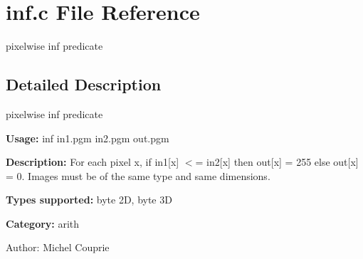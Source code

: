 \section{inf.c File Reference}
\label{inf_8c}
pixelwise inf predicate  




\label{_details}
\subsection{Detailed Description}
pixelwise inf predicate 

{\bf Usage:} inf in1.pgm in2.pgm out.pgm

{\bf Description:} For each pixel x, if in1[x] $<$= in2[x] then out[x] = 255 else out[x] = 0. Images must be of the same type and same dimensions.

{\bf Types supported:} byte 2D, byte 3D

{\bf Category:} arith

\begin{Desc}
\item[Author:]Michel Couprie \end{Desc}
